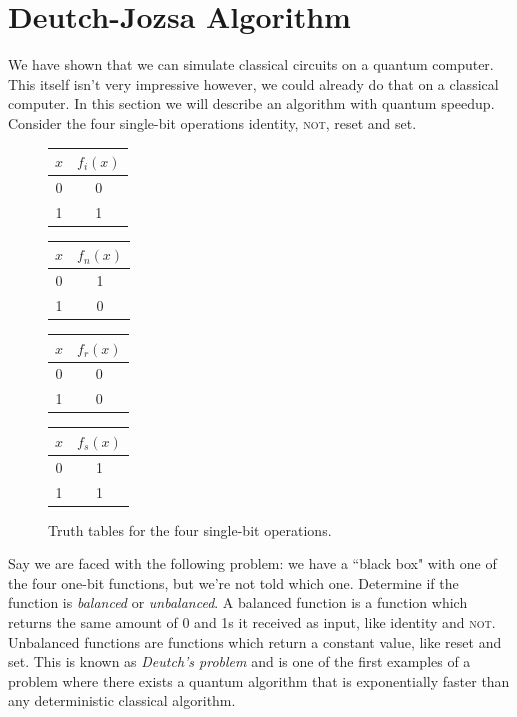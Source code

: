 \documentclass[11pt, notitlepage]{report}
\begin{document}
\section{Deutch-Jozsa Algorithm}
We have shown that we can simulate classical circuits on a quantum computer. This itself isn't very impressive however, we could already do that on a classical computer. In this section we will describe an algorithm with quantum speedup. Consider the four single-bit operations identity, \textsc{not}, reset and set. 

\begin{figure}[ht]
  \centering
  \begin{multicols}{4}
    \begin{tabular}{c|c}
    $x$ & $f_i(x)$ \\ \hline
    0 & 0 \\
    1 & 1 \\
    \end{tabular}

    \begin{tabular}{c|c}
    $x$ & $f_n(x)$ \\ \hline
    0 & 1 \\
    1 & 0 \\
    \end{tabular}

    \begin{tabular}{c|c}
    $x$ & $f_r(x)$ \\ \hline
    0 & 0 \\
    1 & 0 \\
    \end{tabular}

    \begin{tabular}{c|c}
    $x$ & $f_s(x)$ \\ \hline
    0 & 1 \\
    1 & 1 \\
   \end{tabular}
  \end{multicols}

  \vspace{4mm}
  \caption{Truth tables for the four single-bit operations.}
  \label{fig:single_bit_operations}
\end{figure}
\noindent
Say we are faced with the following problem: we have a ``black box" with one of the four one-bit functions, but we're not told which one. Determine if the function is \emph{balanced} or \emph{unbalanced}. A balanced function is a function which returns the same amount of 0 and 1s it received as input, like identity and \textsc{not}. Unbalanced functions are functions which return a constant value, like reset and set. This is known as \emph{Deutch's problem} and is one of the first examples of a problem where there exists a quantum algorithm that is exponentially faster than any deterministic classical algorithm.
\end{document}
